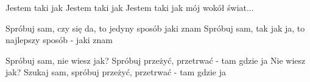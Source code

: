 \documentclass[../../../songbook.tex]{subfiles}
\begin{document}
Jestem taki jak	 \newline
Jestem taki jak	 \newline
Jestem taki jak mój wokół świat...	 \newline

\-\hspace{1cm} Spróbuj sam, czy się da, to jedyny sposób jaki znam	 \newline
\-\hspace{1cm} Spróbuj sam, tak jak ja, to najlepszy sposób - jaki znam	 \newline

\-\hspace{1cm} Spróbuj sam, nie wiesz jak? Spróbuj przeżyć, przetrwać - tam gdzie ja	 \newline
\-\hspace{1cm} Nie wiesz jak? Szukaj sam, spróbuj przeżyć, przetrwać - tam gdzie ja	 \newline
\end{document}
